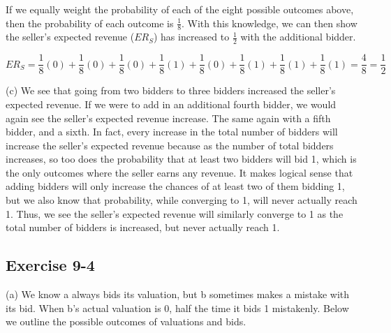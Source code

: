 \documentclass[twoside]{article}
\begin{document}
If we equally weight the probability of each of the eight possible outcomes above, then the probability of each outcome is $\frac{1}{8}$. With this knowledge, we can then show the seller's expected revenue ($ER_{S}$) has increased to $\frac{1}{2}$ with the additional bidder.

$$ER_{S} = \frac{1}{8}(0) + \frac{1}{8}(0) + \frac{1}{8}(0) + \frac{1}{8}(1) + \frac{1}{8}(0) + \frac{1}{8}(1) + \frac{1}{8}(1) + \frac{1}{8}(1) = \frac{4}{8} = \frac{1}{2}$$

(c) We see that going from two bidders to three bidders increased the seller's expected revenue. If we were to add in an additional fourth bidder, we would again see the seller's expected revenue increase. The same again with a fifth bidder, and a sixth. In fact, every increase in the total number of bidders will increase the seller's expected revenue because as the number of total bidders increases, so too does the probability that at least two bidders will bid 1, which is the only outcomes where the seller earns any revenue. It makes logical sense that adding bidders will only increase the chances of at least two of them bidding 1, but we also know that probability, while converging to 1, will never actually reach 1. Thus, we see the seller's expected revenue will similarly converge to 1 as the total number of bidders is increased, but never actually reach 1.

\subsection{Exercise 9-4}
(a) We know a always bids its valuation, but b sometimes makes a mistake with its bid. When b's actual valuation is 0, half the time it bids 1 mistakenly. Below we outline the possible outcomes of valuations and bids.
\end{document}
